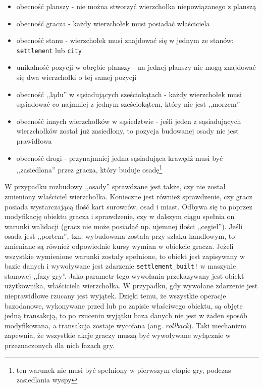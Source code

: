 \documentclass[a4paper,12pt]{article}
\begin{document}
\begin{itemize}
\item obecność planszy - nie można stworzyć wierzchołka niepowiązanego
  z planszą
\item obecność gracza - każdy wierzchołek musi posiadać właściciela
\item obecność stanu - wierzchołek musi znajdować się w jednym ze
  stanów: \texttt{settlement} lub \texttt{city}
\item unikalność pozycji w obrębie planszy - na jednej planszy nie
  mogą znajdować się dwa wierzchołki o tej samej pozycji
\item obecność ,,lądu'' w sąsiadujących sześciokątach - każdy
  wierzchołek musi sąsiadować co najmniej z jednym sześciokątem, który
  nie jest ,,morzem''
\item obecność innych wierzchołków w sąsiedztwie - jeśli jeden z
  sąsiadujących wierzchołków został już zasiedlony, to pozycja
  budowanej osady nie jest prawidłowa
\item obecność drogi - przynajmniej jedna sąsiadująca krawędź musi być
  ,,zasiedlona'' przez gracza, który buduje osadę\footnote{ten warunek
    nie musi być spełniony w pierwszym etapie gry, podczas
    zasiedlania wyspy}
\end{itemize}

W przypadku rozbudowy ,,osady'' sprawdzane jest także, czy nie został
zmieniony właściciel wierzchołka. Konieczne jest również sprawdzenie,
czy gracz posiada wystarczającą ilość kart surowców, osad i
miast. Odbywa się to poprzez modyfikację obiektu gracza i sprawdzenie,
czy w dalszym ciągu spełnia on warunki walidacji (gracz nie może
posiadać np. ujemnej ilości ,,cegieł''). Jeśli osada jest ,,portem'',
tzn. wybudowana została przy szlaku handlowym, to zmieniane są również
odpowiednie kursy wymian w obiekcie gracza. Jeżeli wszystkie
wymienione warunki zostały spełnione, to obiekt jest zapisywany w
bazie danych i wywoływane jest zdarzenie \texttt{settlement\_built!} w
maszynie stanowej ,,fazy gry''. Jako parametr tego wywołania
przekazywany jest obiekt użytkownika, właściciela wierzchołka. W
przypadku, gdy wywołane zdarzenie jest nieprawidłowe rzucany jest
wyjątek. Dzięki temu, że wszystkie operacje bazodanowe, wykonywane
przed lub po zapisie właściwego obiektu, są objęte jedną transakcją,
to po rzuceniu wyjątku baza danych nie jest w żaden sposób
modyfikowana, a transakcja zostaje wycofana
(ang. \emph{rollback}). Taki mechanizm zapewnia, że wszystkie akcje
graczy muszą być wywoływane wyłącznie w przeznaczonych dla nich fazach
gry.
\end{document}
